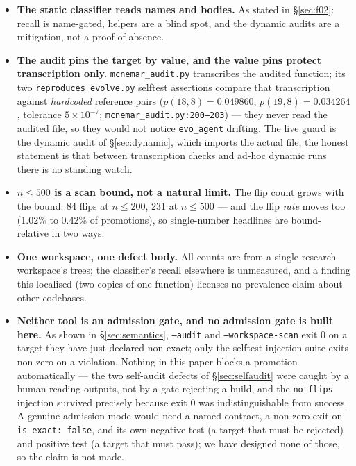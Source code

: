 \documentclass[10pt]{article}
\newcommand{\code}[1]{\texttt{#1}}
\begin{document}
\begin{itemize}
  ground truth \citep{zheng2023judging}.
  \item \textbf{The static classifier reads names and bodies.} As stated in
  \S\ref{sec:f02}: recall is name-gated, helpers are a blind spot, and the
  dynamic audits are a mitigation, not a proof of absence.
  \item \textbf{The audit pins the target by value, and the value pins
  protect transcription only.} \code{mcnemar\_audit.py} transcribes the
  audited function; its two \code{reproduces evolve.py} selftest assertions
  compare that transcription against \emph{hardcoded} reference pairs
  ($p(18,8)=0.049860$, $p(19,8)=0.034264$, tolerance $5\times10^{-7}$;
  \code{mcnemar\_audit.py:200--203}) --- they never read the audited file, so
  they would not notice \code{evo\_agent} drifting. The live guard is the
  dynamic audit of \S\ref{sec:dynamic}, which imports the actual file; the
  honest statement is that between transcription checks and ad-hoc dynamic
  runs there is no standing watch.
  \item \textbf{$n \le 500$ is a scan bound, not a natural limit.} The flip
  count grows with the bound: 84 flips at $n\le200$, 231 at $n\le500$ ---
  and the flip \emph{rate} moves too (1.02\% to 0.42\% of promotions), so
  single-number headlines are bound-relative in two ways.
  \item \textbf{One workspace, one defect body.} All counts are from a single
  research workspace's trees; the classifier's recall elsewhere is
  unmeasured, and a finding this localised (two copies of one function)
  licenses no prevalence claim about other codebases.
  \item \textbf{Neither tool is an admission gate, and no admission gate is
  built here.} As shown in \S\ref{sec:semantics}, \code{--audit} and
  \code{--workspace-scan} exit $0$ on a target they have just declared
  non-exact; only the selftest injection suite exits non-zero on a violation.
  Nothing in this paper blocks a promotion automatically --- the two self-audit
  defects of \S\ref{sec:selfaudit} were caught by a human reading outputs, not
  by a gate rejecting a build, and the \code{no-flips} injection survived
  precisely because exit $0$ was indistinguishable from success. A genuine
  admission mode would need a named contract, a non-zero exit on
  \code{is\_exact: false}, and its own negative test (a target that must be
  rejected) and positive test (a target that must pass); we have designed none
  of those, so the claim is not made.
\end{itemize}
\end{document}
